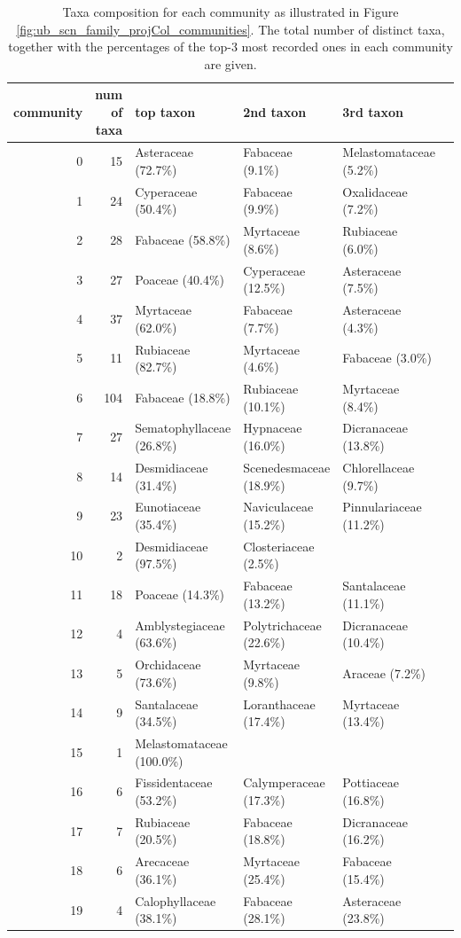 \begin{table}
\begin{table}[H]
  \caption{Taxa composition for each community as illustrated in Figure \ref{fig:ub_scn_family_projCol_communities}. The total number of distinct taxa, together with the percentages of the top-3 most recorded ones in each community are given.}
  \begin{center}
  \begin{tabular}{r r l l l l}
      community & num of taxa & top taxon & 2nd taxon & 3rd taxon \\
      \hline
0 & 15 & Asteraceae (72.7\%) & Fabaceae (9.1\%) & Melastomataceae (5.2\%) \\
1 & 24 & Cyperaceae (50.4\%) & Fabaceae (9.9\%) & Oxalidaceae (7.2\%) \\
2 & 28 & Fabaceae (58.8\%) & Myrtaceae (8.6\%) & Rubiaceae (6.0\%) \\
3 & 27 & Poaceae (40.4\%) & Cyperaceae (12.5\%) & Asteraceae (7.5\%) \\
4 & 37 & Myrtaceae (62.0\%) & Fabaceae (7.7\%) & Asteraceae (4.3\%) \\
5 & 11 & Rubiaceae (82.7\%) & Myrtaceae (4.6\%) & Fabaceae (3.0\%) \\
6 & 104 & Fabaceae (18.8\%) & Rubiaceae (10.1\%) & Myrtaceae (8.4\%) \\
7 & 27 & Sematophyllaceae (26.8\%) & Hypnaceae (16.0\%) & Dicranaceae (13.8\%) \\
8 & 14 & Desmidiaceae (31.4\%) & Scenedesmaceae (18.9\%) & Chlorellaceae (9.7\%) \\
9 & 23 & Eunotiaceae (35.4\%) & Naviculaceae (15.2\%) & Pinnulariaceae (11.2\%) \\
10 & 2 & Desmidiaceae (97.5\%) & Closteriaceae (2.5\%) \\
11 & 18 & Poaceae (14.3\%) & Fabaceae (13.2\%) & Santalaceae (11.1\%) \\
12 & 4 & Amblystegiaceae (63.6\%) & Polytrichaceae (22.6\%) & Dicranaceae (10.4\%) \\
13 & 5 & Orchidaceae (73.6\%) & Myrtaceae (9.8\%) & Araceae (7.2\%) \\
14 & 9 & Santalaceae (34.5\%) & Loranthaceae (17.4\%) & Myrtaceae (13.4\%) \\
15 & 1 & Melastomataceae (100.0\%) \\
16 & 6 & Fissidentaceae (53.2\%) & Calymperaceae (17.3\%) & Pottiaceae (16.8\%) \\
17 & 7 & Rubiaceae (20.5\%) & Fabaceae (18.8\%) & Dicranaceae (16.2\%) \\
18 & 6 & Arecaceae (36.1\%) & Myrtaceae (25.4\%) & Fabaceae (15.4\%) \\
19 & 4 & Calophyllaceae (38.1\%) & Fabaceae (28.1\%) & Asteraceae (23.8\%) \\
      \hline
  \end{tabular}
  \label{table:ub_scn_family_projCol_composition}
  \end{center}
\end{table}
\end{table}


